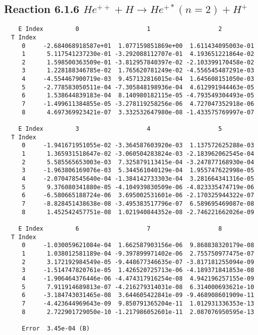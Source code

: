 \documentclass[12pt]{article}
\begin{document}
                               


\newpage
\subsection{
Reaction 6.1.6 $   He^{++} + H \rightarrow He^{+*}(n=2) + H^+$}


\begin{small}\begin{verbatim}
    E Index         0                   1                   2
  T Index
     0     -2.684068918587e+01  1.077159851869e+00  1.611434095003e-01
     1      5.117541237230e-01 -3.292088112707e-01  4.193651221864e-02
     2      1.598500363509e-01 -3.812957840397e-02 -2.103399170458e-02
     3      1.228188346785e-02  1.765620781249e-02 -4.556545487291e-03
     4     -4.554467900719e-03  9.457132816015e-04  1.645608151050e-03
     5     -2.778583050511e-04 -7.305848198936e-04  4.612991944463e-05
     6      1.538644839183e-04  8.140980182115e-05 -4.793549304493e-05
     7     -1.499611384855e-05 -3.278119258256e-06  4.727047352918e-06
     8      4.697369923421e-07  3.332532647980e-08 -1.433575769997e-07

    E Index         3                   4                   5
  T Index
     0     -1.941671951055e-02 -3.364587603920e-03  1.137572625288e-03
     1      1.365931518647e-02 -3.060504283824e-03 -2.183962062545e-04
     2      5.585565653003e-03  7.325879113415e-04 -3.247877168930e-04
     3     -1.963806169076e-03  5.344561040129e-04  1.955747622998e-05
     4     -2.070478545640e-04 -1.384142733303e-04  3.281664341316e-05
     5      9.376080341880e-05 -4.104939830509e-06 -4.823335474719e-06
     6     -6.580665188724e-06  3.695002531601e-06 -2.170325944322e-07
     7     -8.828451438638e-08 -3.495383517796e-07  6.589695469087e-08
     8      1.452542457751e-08  1.021940844352e-08 -2.746221662026e-09

    E Index         6                   7                   8
  T Index
     0     -1.030059621084e-04  1.662587903156e-06  9.868838320179e-08
     1      1.038012581189e-04 -9.397899971402e-06  2.755750977475e-07
     2      3.172192984549e-05 -9.448677346635e-07 -3.817181255094e-09
     3     -1.514747820761e-05  1.426520725713e-06 -4.189371841853e-08
     4     -1.906464376446e-06 -4.474317916254e-08  4.942196257155e-09
     5      7.911914689813e-07 -4.216279314031e-08  6.314000693621e-10
     6     -3.184743031465e-08  3.644605422841e-09 -9.468908601909e-11
     7     -4.423644969643e-09  9.850791365204e-11  1.012931336353e-13
     8      2.722901729050e-10 -1.217986052601e-11  2.087076950595e-13

     Error  3.45e-04 (B)
\end{verbatim}\end{small}
\end{document}
